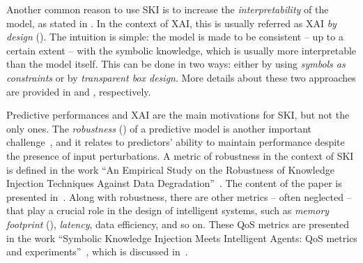 Another common reason to use \gls{SKI} is to increase the \emph{interpretability} of the model, as stated in .
%
In the context of \gls{XAI}, this is usually referred as \gls{XAI} \emph{by design} ().
%
The intuition is simple: the model is made to be consistent -- up to a certain extent -- with the symbolic knowledge, which is usually more interpretable than the model itself.
%
This can be done in two ways: either by using \emph{symbols as constraints} or by \emph{transparent box design}.
%
More details about these two approaches are provided in  and , respectively.


Predictive performances and \gls{XAI} are the main motivations for \gls{SKI}, but not the only ones.
%
The \emph{robustness} () of a predictive model is another important challenge~\cite{DBLP:conf/eccv/LiuCZH18}, and it relates to predictors' ability to maintain performance despite the presence of input perturbations.
%
A metric of robustness in the context of \gls{SKI} is defined in the work ``An Empirical Study on the Robustness of Knowledge Injection Techniques Against Data Degradation''~\cite{DBLP:conf/woa/RafanelliMACO24}.
%
The content of the paper is presented in~.
%
Along with robustness, there are other metrics -- often neglected -- that play a crucial role in the design of intelligent systems, such as \emph{memory footprint} (), \emph{latency}, data efficiency, and so on.
%
These \gls{QoS} metrics are presented in the work ``Symbolic Knowledge Injection Meets Intelligent Agents: QoS metrics and experiments''~\cite{DBLP:journals/aamas/AgiolloRMCO23}, which is discussed in~.


